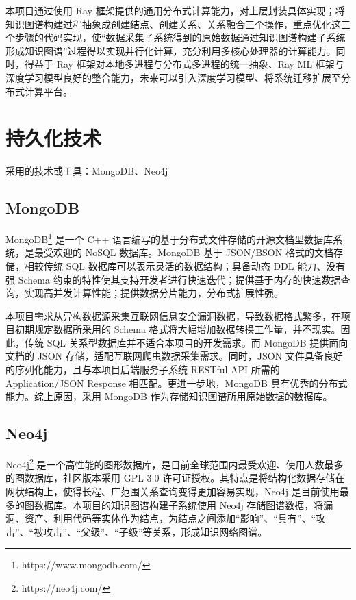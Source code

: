 \documentclass[a4paper,AutoFakeBold,oneside,12pt]{book}
\begin{document}
本项目通过使用 Ray 框架提供的通用分布式计算能力，对上层封装具体实现；将知识图谱构建过程抽象成创建结点、创建关系、关系融合三个操作，重点优化这三个步骤的代码实现，使``数据采集子系统得到的原始数据通过知识图谱构建子系统形成知识图谱''过程得以实现并行化计算，充分利用多核心处理器的计算能力。同时，得益于 Ray 框架对本地多进程与分布式多进程的统一抽象、Ray ML 框架与深度学习模型良好的整合能力，未来可以引入深度学习模型、将系统迁移扩展至分布式计算平台。

\section{持久化技术}

采用的技术或工具：MongoDB、Neo4j

\subsection{MongoDB}

MongoDB\footnote{https://www.mongodb.com/} 是一个 C++ 语言编写的基于分布式文件存储的开源文档型数据库系统，是最受欢迎的 NoSQL 数据库。MongoDB 基于 JSON/BSON 格式的文档存储，相较传统 SQL 数据库可以表示灵活的数据结构；具备动态 DDL 能力、没有强 Schema 约束的特性使其支持开发者进行快速迭代；提供基于内存的快速数据查询，实现高并发计算性能；提供数据分片能力，分布式扩展性强。

本项目需求从异构数据源采集互联网信息安全漏洞数据，导致数据格式繁多，在项目初期规定数据所采用的 Schema 格式将大幅增加数据转换工作量，并不现实。因此，传统 SQL 关系型数据库并不适合本项目的开发需求。而 MongoDB 提供面向文档的 JSON 存储，适配互联网爬虫数据采集需求。同时，JSON 文件具备良好的序列化能力，且与本项目后端服务子系统 RESTful API 所需的 Application/JSON Response 相匹配。更进一步地，MongoDB 具有优秀的分布式能力。综上原因，采用 MongoDB 作为存储知识图谱所用原始数据的数据库。

\subsection{Neo4j}

Neo4j\footnote{https://neo4j.com/} 是一个高性能的图形数据库，是目前全球范围内最受欢迎、使用人数最多的图数据库，社区版本采用 GPL-3.0 许可证授权。其特点是将结构化数据存储在网状结构上，使得长程、广范围关系查询变得更加容易实现，Neo4j 是目前使用最多的图数据库。本项目的知识图谱构建子系统使用 Neo4j 存储图谱数据，将漏洞、资产、利用代码等实体作为结点，为结点之间添加``影响''、``具有''、``攻击''、``被攻击''、``父级''、``子级''等关系，形成知识网络图谱。
\end{document}
